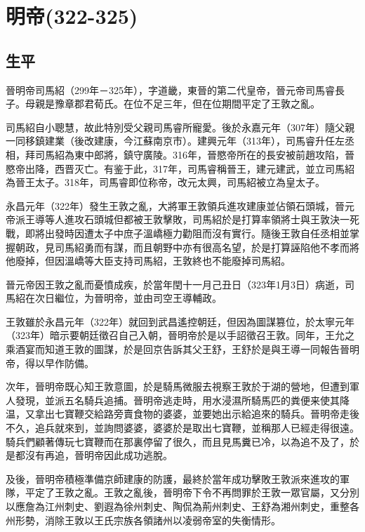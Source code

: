 
\section{明帝\tiny(322-325)}

\subsection{生平}

晉明帝司馬紹（299年－325年），字道畿，東晉的第二代皇帝，晉元帝司馬睿長子。母親是豫章郡君荀氏。在位不足三年，但在位期間平定了王敦之亂。

司馬紹自小聰慧，故此特別受父親司馬睿所寵愛。後於永嘉元年（307年）隨父親一同移鎮建業（後改建康，今江蘇南京市）。建興元年（313年），司馬睿升任左丞相，拜司馬紹為東中郎將，鎮守廣陵。316年，晉愍帝所在的長安被前趙攻陷，晉愍帝出降，西晋灭亡。有鉴于此，317年，司馬睿稱晉王，建元建武，並立司馬紹為晉王太子。318年，司馬睿即位称帝，改元太興，司馬紹被立為皇太子。

永昌元年（322年）發生王敦之亂，大將軍王敦領兵進攻建康並佔領石頭城，晉元帝派王導等人進攻石頭城但都被王敦擊敗，司馬紹於是打算率領將士與王敦決一死戰，即將出發時因遭太子中庶子溫嶠極力勸阻而沒有實行。隨後王敦自任丞相並掌握朝政，見司馬紹勇而有謀，而且朝野中亦有很高名望，於是打算誣陷他不孝而將他廢掉，但因溫嶠等大臣支持司馬紹，王敦終也不能廢掉司馬紹。

晉元帝因王敦之亂而憂憤成疾，於當年閏十一月己丑日（323年1月3日）病逝，司馬紹在次日繼位，为晉明帝，並由司空王導輔政。

王敦雖於永昌元年（322年）就回到武昌遙控朝廷，但因為圖謀篡位，於太寧元年（323年）暗示要朝廷徵召自己入朝，晉明帝於是以手詔徵召王敦。同年，王允之乘酒宴而知道王敦的圖謀，於是回京告訴其父王舒，王舒於是與王導一同報告晉明帝，得以早作防備。

次年，晉明帝既心知王敦意圖，於是騎馬微服去視察王敦於于湖的營地，但遭到軍人發現，並派五名騎兵追捕。晉明帝逃走時，用水浸濕所騎馬匹的粪便来使其降温，又拿出七寶鞭交給路旁賣食物的婆婆，並要她出示給追來的騎兵。晉明帝走後不久，追兵就來到，並詢問婆婆，婆婆於是取出七寶鞭，並稱那人已經走得很遠。騎兵們顧著傳玩七寶鞭而在那裏停留了很久，而且見馬糞已冷，以為追不及了，於是都沒有再追，晉明帝因此成功逃脫。

及後，晉明帝積極準備京師建康的防護，最終於當年成功擊敗王敦派來進攻的軍隊，平定了王敦之亂。王敦之亂後，晉明帝下令不再問罪於王敦一眾官屬，又分別以應詹為江州刺史、劉遐為徐州刺史、陶侃為荊州刺史、王舒為湘州刺史，重整各州形勢，消除王敦以王氏宗族各領諸州以凌弱帝室的失衡情形。

